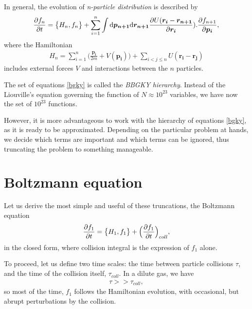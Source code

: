 In general, the evolution of \textit{n-particle distribution} is described by
\begin{align} \label{bgky}
\frac{\partial f_n}{\partial t} = \big\{ H_n, f_n \big\} + \sum_{i=1}^n \int \mathrm{d} \bm{p_{n+1}} \mathrm{d} \bm{r_{n+1}} \frac{\partial U(\bm{r_i} - \bm{r_{n+1}}}{\partial \bm{r_i}}).\frac{\partial f_{n+1}}{\partial \bm{p_i}},
\end{align}
where the Hamiltonian 
\begin{align*}
H_n = \sum_{i=1}^n \Big(\frac{\bm{p_i}}{2m} + V(\bm{p_i})\Big) + \sum_{i<j\leq n} U(\bm{r_i} - \bm{r_j})
\end{align*}
includes external forces $V$ and interactions between the $n$ particles.

The set of equations \ref{bgky} is called the \textit{BBGKY hierarchy}.
Instead of the Liouville's equation governing the function of $N \approx 10^{23}$ variables, we have now the set of $10^{23}$ functions.

However, it is more advantageous to work with the hierarchy of equations \ref{bgky}, as it is ready to be approximated. Depending on the particular problem at hands, we decide which terms are important and which terms can be ignored, thus truncating the problem to something manageable.

\section{Boltzmann equation}
Let us derive the most simple and useful of these truncations, the Boltzmann equation
\begin{align*}
\frac{\partial f_1}{\partial t} = \big\{ H_1, f_1 \big\} + \Big(\frac{\partial f_1}{\partial t} \Big)_{coll},
\end{align*}
in the closed form, where collision integral is the expression of $f_1$ alone.
%

To proceed, let us define two time scales:
the time between particle collisions $\tau$, and the time of the collision itself, $\tau_{coll}$.
In a dilute gas, we have
\begin{align*}
\tau >> \tau_{coll},
\end{align*}
so most of the time, $f_1$ follows the Hamiltonian evolution, with occasional, but abrupt perturbations by the collision. 

